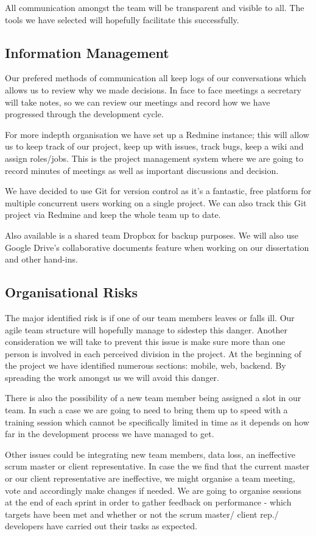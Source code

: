 \documentclass{l3proj}
\begin{document}
All communication amongst the team will be transparent and visible to all. The tools we have selected will hopefully facilitate this successfully.

\subsection{Information Management}Our prefered methods of communication all keep logs of our conversations which allows us to review why we made decisions. In face to face meetings a secretary will take notes, so we can review our meetings and record how we have progressed through the development cycle.

For more indepth organisation we have set up a Redmine instance; this will allow us to keep track of our project, keep up with issues, track bugs, keep a wiki and assign roles/jobs. This is the project management system where we are going to record minutes of meetings as well as important discussions and decision.

We have decided to use Git for version control as it’s a fantastic, free platform for multiple concurrent users working on a single project. We can also track this Git project via Redmine and keep the whole team up to date.

Also available is a shared team Dropbox for backup purposes. We will also use Google Drive’s collaborative documents feature when working on our dissertation and other hand-ins.

\subsection{Organisational Risks}The major identified risk is if one of our team members leaves or falls ill. Our agile team structure will hopefully manage to sidestep this danger. Another consideration we will take to prevent this issue is make sure more than one person is involved in each perceived division in the project. At the beginning of the project we have identified numerous sections: mobile, web, backend. By spreading the work amongst us we will avoid this danger.

There is also the possibility of a new team member being assigned a slot in our team. In such a case we are going to need to bring them up to speed with a training session which cannot be specifically limited in time as it depends on how far in the development process we have managed to get.

Other issues could be integrating new team members, data loss, an ineffective scrum master or client representative. In case the we find that the current master or our client representative are ineffective, we might organise a team meeting, vote and accordingly make changes if needed. We are going to organise sessions at the end of each sprint in order to gather feedback on performance - which targets have been met and whether or not the scrum master/ client rep./ developers have carried out their tasks as expected.
\end{document}
